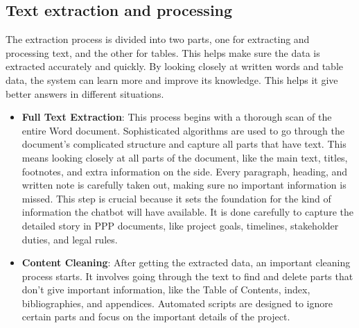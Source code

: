 \subsection{Text extraction and processing}
The extraction process is divided into two parts, one for extracting and processing text, and the other for tables. This helps make sure the data is extracted accurately and quickly. By looking closely at written words and table data, the system can learn more and improve its knowledge. This helps it give better answers in different situations.
\vskip 0.5cm
\begin{itemize}
\item \textbf{Full Text Extraction}: This process begins with a thorough scan of the entire Word document. Sophisticated algorithms are used to go through the document's complicated structure and capture all parts that have text. This means looking closely at all parts of the document, like the main text, titles, footnotes, and extra information on the side. Every paragraph, heading, and written note is carefully taken out, making sure no important information is missed.%
\vskip 0.5cm
This step is crucial because it sets the foundation for the kind of information the chatbot will have available. It is done carefully to capture the detailed story in PPP documents, like project goals, timelines, stakeholder duties, and legal rules.
\vskip 0.5cm
\item \textbf{Content Cleaning}: After getting the extracted data, an important cleaning process starts. It involves going through the text to find and delete parts that don't give important information, like the Table of Contents, index, bibliographies, and appendices. Automated scripts are designed to ignore certain parts and focus on the important details of the project.%

\end{itemize}
